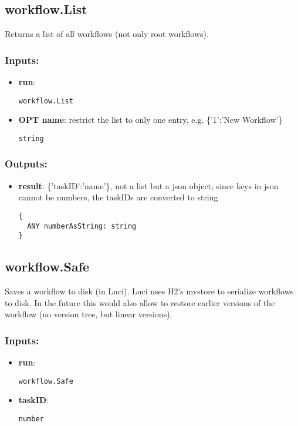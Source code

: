 \subsection{workflow.List}
\label{ch:builtinservices:workflow.List}
Returns a list of all workflows (not only root workflows).
\subsubsection*{Inputs:}
\begin{itemize}
    \item \textbf{run}: 
\begin{lstlisting}
workflow.List
\end{lstlisting}
    \item \textbf{OPT name}: restrict the list to only one entry, e.g. \{'1':'New Workflow'\}
\begin{lstlisting}
string
\end{lstlisting}
  \end{itemize}

\subsubsection*{Outputs:}
\begin{itemize}
    \item \textbf{result}: \{'taskID':'name'\}, not a list but a json object; since keys in json cannot be numbers, the taskIDs are converted to string
\begin{lstlisting}
{
  ANY numberAsString: string
}
\end{lstlisting}
  \end{itemize}

\subsection{workflow.Safe}
\label{ch:builtinservices:workflow.Safe}
Saves
 a workflow to disk (in Luci). Luci uses H2's mvstore to serialize 
workflows to disk. In the future this would also allow to restore 
earlier versions of the workflow (no version tree, but linear versions).
\subsubsection*{Inputs:}
\begin{itemize}
    \item \textbf{run}: 
\begin{lstlisting}
workflow.Safe
\end{lstlisting}
    \item \textbf{taskID}: 
\begin{lstlisting}
number
\end{lstlisting}
  \end{itemize}

